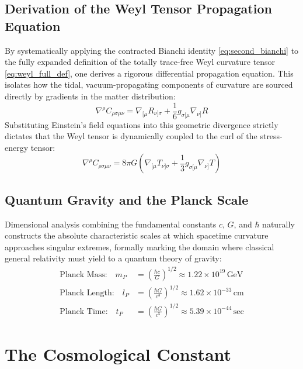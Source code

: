 \documentclass[11pt, a4paper]{report}
\begin{document}
\subsection{Derivation of the Weyl Tensor Propagation Equation}
By systematically applying the contracted Bianchi identity \eqref{eq:second_bianchi} to the fully expanded definition of the totally trace-free Weyl curvature tensor \eqref{eq:weyl_full_def}, one derives a rigorous differential propagation equation. This isolates how the tidal, vacuum-propagating components of curvature are sourced directly by gradients in the matter distribution:
\begin{equation}
\label{eq:weyl_geometric_divergence}
\nabla^{\rho}C_{\rho\sigma\mu\nu} = \nabla_{[\mu} R_{\nu]\sigma} + \frac{1}{6} g_{\sigma[\mu} \nabla_{\nu]} R
\end{equation}
Substituting Einstein's field equations into this geometric divergence strictly dictates that the Weyl tensor is dynamically coupled to the curl of the stress-energy tensor:
\begin{equation}
\nabla^{\rho}C_{\rho\sigma\mu\nu} = 8\pi G \left( \nabla_{[\mu} T_{\nu]\sigma} + \frac{1}{3} g_{\sigma[\mu} \nabla_{\nu]} T \right)
\end{equation}

\subsection{Quantum Gravity and the Planck Scale}
Dimensional analysis combining the fundamental constants $c$, $G$, and $\hbar$ naturally constructs the absolute characteristic scales at which spacetime curvature approaches singular extremes, formally marking the domain where classical general relativity must yield to a quantum theory of gravity:
\begin{align}
\text{Planck Mass:} \quad m_{P} &= \left(\frac{\hbar c}{G}\right)^{1/2} \approx 1.22 \times 10^{19} \, \text{GeV} \\
\text{Planck Length:} \quad l_{P} &= \left(\frac{\hbar G}{c^{3}}\right)^{1/2} \approx 1.62 \times 10^{-33} \, \text{cm} \\
\text{Planck Time:} \quad t_{P} &= \left(\frac{\hbar G}{c^{5}}\right)^{1/2} \approx 5.39 \times 10^{-44} \, \text{sec} 
\end{align}

\section{The Cosmological Constant}
\end{document}

